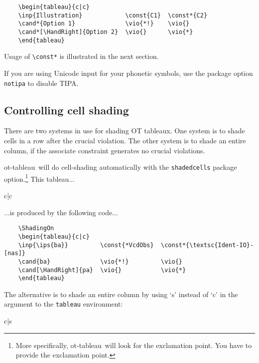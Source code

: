 \documentclass{article}
\def\tabl{\textsf{ot-tableau}}
\begin{document}
\begin{verbatim}
	\begin{tableau}{c|c}
	\inp{Illustration}            \const{C1}  \const*{C2}
	\cand*{Option 1}              \vio{*!}    \vio{}
	\cand*[\HandRight]{Option 2}  \vio{}      \vio{*}
	\end{tableau}
\end{verbatim}

\noindent Usage of \verb+\const*+ is illustrated in the next section.

If you are using Unicode input for your phonetic symbols, use the package option \verb+notipa+ to disable TIPA.
 
\subsection{Controlling cell shading}

There are two systems in use for shading OT tableaux. One system is to shade cells in a row after the crucial violation. The other system is to shade an entire column, if the associate constraint generates no crucial violations.

\tabl\ will do cell-shading automatically with the \verb+shadedcells+ package option.\footnote{More specifically, \tabl\ will look for the exclamation point. You have to provide the exclamation point.} This tableau...

\begin{center}
	\ShadingOn
	\begin{tableau}{c|c}
				
			\vio{*!}	\vio{}
		\vio{}		\vio{*}
	\end{tableau}
\end{center}

\noindent ...is produced by the following code...

\begin{verbatim}
	\ShadingOn
	\begin{tableau}{c|c}
	\inp{\ips{ba}}         \const{*VcdObs}  \const*{\textsc{Ident-IO}-[nas]}
	\cand{ba}              \vio{*!}         \vio{}
	\cand[\HandRight]{pa}  \vio{}           \vio{*}
	\end{tableau}
\end{verbatim}

The alternative is to shade an entire column by using `s' instead of `c' in the argument to the \verb+tableau+ environment:

\begin{center}
	\begin{tableau}{c|s}
	           
	              \vio{*!}         \vio{}
	  \vio{}           \vio{*}
	\end{tableau}
\end{center}
\end{document}
